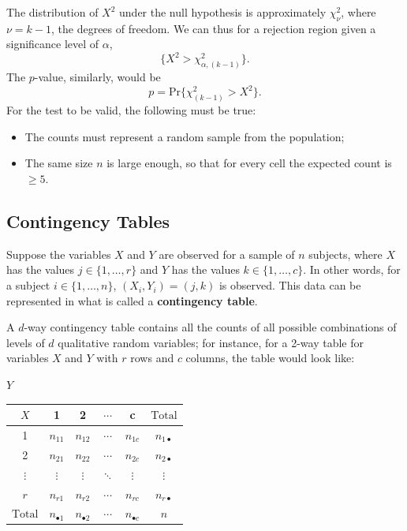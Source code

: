 \documentclass[12pt]{article}
\begin{document}
The distribution of $X^2$ under the null hypothesis is approximately $\chi^2_\nu$, where $\nu = k-1$, the degrees of freedom. We can thus for a rejection region given a significance level of $\alpha$, \[\{X^2 > \chi^2_{\alpha, (k-1)}\}.\] The $p$-value, similarly, would be \[p = \text{Pr}\{\chi^2_{(k-1)} > X^2\}.\] For the test to be valid, the following must be true:
\begin{itemize}
    \item The counts must represent a random sample from the population;
    \item The same size $n$ is large enough, so that for every cell the expected count is $\geq 5$.
\end{itemize}

\subsection{Contingency Tables}

Suppose the variables $X$ and $Y$ are observed for a sample of $n$ subjects, where $X$ has the values $j \in \{1, \dots, r\}$ and $Y$ has the values $k \in \{1, \dots, c\}$. In other words, for a subject $i \in \{1, \dots, n\}$, $(X_i, Y_i) = (j,k)$ is observed. This data can be represented in what is called a \textbf{contingency table}.

A $d$-way contingency table contains all the counts of all possible combinations of levels of $d$ qualitative random variables; for instance, for a 2-way table for variables $X$ and $Y$ with $r$ rows and $c$ columns, the table would look like:

\begin{center}
    $Y$\\
    \begin{tabular}{c | c c c c | c}
        $X$ & 1 & 2 & $\cdots$ & c & $\text{Total}$\\
        \hline
        1 & $n_{11}$ & $n_{12}$ & $\cdots$ & $n_{1c}$ & $n_{1\bullet}$\\
        2 & $n_{21}$ & $n_{22}$ & $\cdots$ & $n_{2c}$ & $n_{2\bullet}$\\
        $\vdots$ & $\vdots$ & $\vdots$ & $\ddots$ & $\vdots$ & $\vdots$\\
        $r$ & $n_{r1}$ & $n_{r2}$ & $\cdots$ & $n_{rc}$ & $n_{r\bullet}$\\
        \hline
        $\text{Total}$ & $n_{\bullet 1}$ & $n_{\bullet 2}$ & $\cdots$ & $n_{\bullet c}$ & $n$\\
        \hline
    \end{tabular}
\end{center}
\end{document}
